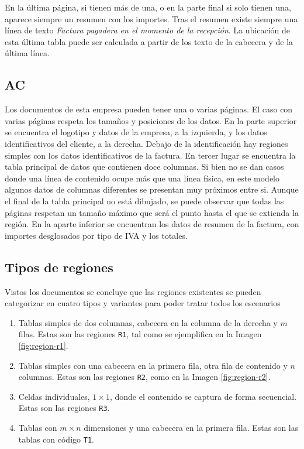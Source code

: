 En la última página, si tienen más de una, o en la parte final si solo tienen una, aparece siempre un resumen con los importes. Tras el resumen existe siempre una línea de texto \emph{Factura pagadera en el momento de la recepción}. La ubicación de esta última tabla puede ser calculada a partir de los texto de la cabecera y de la última línea.

\subsection{AC}

Los documentos de esta empresa pueden tener una o varias páginas. El caso con varias páginas respeta los tamaños y posiciones de los datos. En la parte superior se encuentra el logotipo y datos de la empresa, a la izquierda, y los datos identificativos del cliente, a la derecha. Debajo de la identificación hay regiones simples con los datos identificativos de la factura. En tercer lugar se encuentra la tabla principal de datos que contienen doce columnas. Si bien no se dan casos donde una línea de contenido ocupe más que una línea física, en este modelo algunos datos de columnas diferentes se presentan muy próximos entre si. Aunque el final de la tabla principal no está dibujado, se puede observar que todas las páginas respetan un tamaño máximo que será el punto hasta el que se extienda la región. En la aparte inferior se encuentran los datos de resumen de la factura, con importes desglosados por tipo de IVA y los totales.
 
\subsection{Tipos de regiones}

Vistos los documentos se concluye que las regiones existentes se pueden categorizar en cuatro tipos y variantes para poder tratar todos los escenarios

\begin{enumerate}
	\item Tablas simples de dos columnas, cabecera en la columna de la derecha y $m$ filas. Estas son las regiones \verb|R1|, tal como se ejemplifica en la Imagen \ref{fig:region-r1}.
	\item Tablas simples con una cabecera en la primera fila, otra fila de contenido y $n$ columnas. Estas son las regiones \verb|R2|, como en la Imagen \ref{fig:region-r2}.
	\item Celdas individuales, $1\times 1$, donde el contenido se captura de forma secuencial. Estas son las regiones \verb|R3|.
	\item Tablas con $m\times n$ dimensiones y una cabecera en la primera fila. Estas son las tablas con código \verb|T1|.
\end{enumerate}

